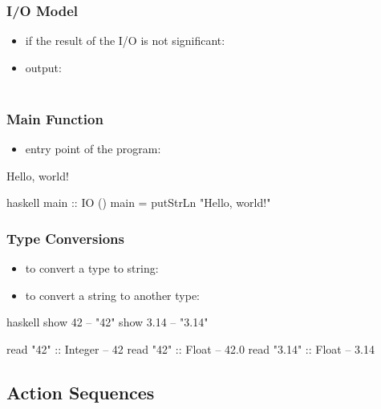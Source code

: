 \documentclass[dvipsnames]{beamer}
\theoremstyle{plain}
\begin{document}
\begin{frame}
  \frametitle{I/O Model}

  \begin{itemize}
    \item if the result of the I/O is not significant: 

    \medskip
    \item output:\\
      \smallskip
      \\
  \end{itemize}
\end{frame}

\begin{frame}[fragile]
  \frametitle{Main Function}

  \begin{itemize}
    \item entry point of the program: 
  \end{itemize}

  \begin{exampleblock}{Hello, world!}
    \begin{pygments}{haskell}
main :: IO ()
main = putStrLn "Hello, world!"
    \end{pygments}
  \end{exampleblock}
\end{frame}

\begin{frame}[fragile]
  \frametitle{Type Conversions}

  \begin{itemize}
    \item to convert a type to string: 
    \item to convert a string to another type: 
  \end{itemize}

  \begin{exampleblock}{}
    \begin{pygments}{haskell}
show 42    -- "42"
show 3.14  -- "3.14"

read "42" :: Integer  -- 42
read "42" :: Float    -- 42.0
read "3.14" :: Float  -- 3.14
    \end{pygments}
  \end{exampleblock}
\end{frame}

\subsection{Action Sequences}
\end{document}
